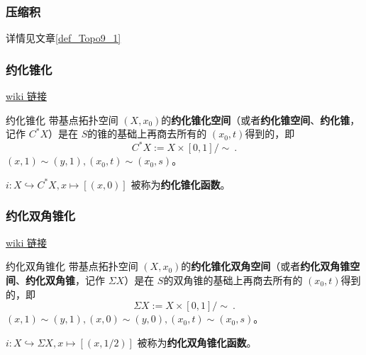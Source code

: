 
\subsubsection{压缩积}

详情见文章\autoref{def_Topo9_1}~


\subsubsection{约化锥化}

\href{https://en.wikipedia.org/wiki/Cone_(topology)\%5C#Reduced_cone}{wiki 链接}

\begin{definition}{约化锥化}
带基点拓扑空间 $(X, x_0)$的\textbf{约化锥化空间}（或者\textbf{约化锥空间}、\textbf{约化锥}，记作 $C^* X$）是在 $S$的锥的基础上再商去所有的 $(x_0, t)$得到的，即
\[
    C^* X := X \times [0,1] / \sim~.
\]
$(x, 1) \sim (y, 1), (x_0, t) \sim (x_0, s)$。

$i: X \hookrightarrow C^* X, x \mapsto [(x, 0)]$ 被称为\textbf{约化锥化函数}。
\end{definition}

\subsubsection{约化双角锥化}

\href{https://en.wikipedia.org/wiki/Suspension_(topology)\%5C#Reduced_suspension}{wiki 链接}

\begin{definition}{约化双角锥化}
带基点拓扑空间 $(X, x_0)$的\textbf{约化锥化双角空间}（或者\textbf{约化双角锥空间}、\textbf{约化双角锥}，记作 $\Sigma X$）是在 $S$的双角锥的基础上再商去所有的 $(x_0, t)$得到的，即
\[
    \Sigma X := X \times [0,1] / \sim~.
\]
$(x, 1) \sim (y, 1), (x, 0) \sim (y, 0), (x_0, t) \sim (x_0, s)$。

$i: X \hookrightarrow \Sigma X, x \mapsto [(x, 1/2)]$ 被称为\textbf{约化双角锥化函数}。
\end{definition}


